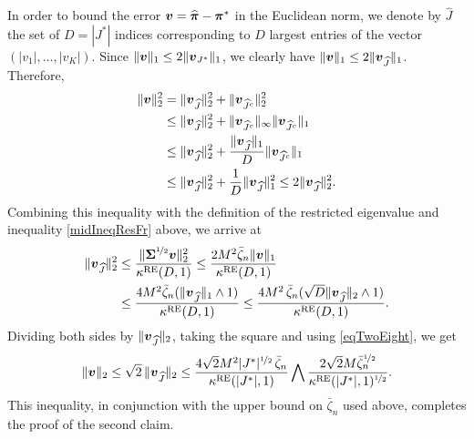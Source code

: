 In order to bound the error $\boldsymbol v=\widehat{\boldsymbol \pi}-\boldsymbol \pi^*$ in the Euclidean norm, we denote
by $\hat J $ the set of $D = |J^*|$ indices corresponding to $D$ largest entries of the
vector $(|v_1|,\ldots,|v_K|)$. Since $\|\boldsymbol v\|_1\le 2\|\boldsymbol v_{J^*}\|_1$, we clearly have
$\|\boldsymbol v\|_1\le 2\|\boldsymbol v_{\widehat J}\|_1$. Therefore,
\begin{align}
\|\boldsymbol v\|_2^2
&= \|\boldsymbol v_{\widehat J}\|_2^2+\|\boldsymbol v_{\widehat J^c}\|_2^2\\
&\le \|\boldsymbol v_{\widehat J}\|_2^2+\|\boldsymbol v_{\widehat J^c}\|_\infty\|\boldsymbol v_{\widehat J^c}\|_1\\
&\le \|\boldsymbol v_{\widehat J}\|_2^2+\frac{\|\boldsymbol v_{\widehat J}\|_1}{D}\|\boldsymbol v_{\widehat J^c}\|_1\\
&\le \|\boldsymbol v_{\widehat J}\|_2^2+\frac{1}{D}\|\boldsymbol v_{\widehat J}\|_1^2\le 2\|\boldsymbol v_{\widehat J}\|_2^2
\label{eqTwoEight}.
\end{align}
Combining this inequality with the definition of the restricted eigenvalue and
inequality \eqref{midIneqResFr} above, we arrive at
\begin{align}
\|\boldsymbol v_{\widehat J}\|_2^2&\le \frac{\|\boldsymbol\Sigma^{\nicefrac12}\boldsymbol v\|_2^2}{\kappa^{\rm RE}(D,1)}
\le  \frac{2M^2\bar\zeta_n\|\boldsymbol v\|_1}{\kappa^{\rm RE}(D,1)}\\
&\le  \frac{4M^2\bar\zeta_n(\|\boldsymbol v_{\widehat J}\|_1\wedge 1)}{\kappa^{\rm RE}(D,1)}
\le  \frac{4M^2\,\bar\zeta_n(\sqrt{D}\|\boldsymbol v_{\widehat J}\|_2\wedge 1)}{\kappa^{\rm RE}(D,1)}.
\end{align}
Dividing both sides by $\|\boldsymbol v_{\widehat J}\|_2$, taking the square and using \eqref{eqTwoEight},
we get
\begin{align}
\|\boldsymbol v\|_2\le \sqrt2\,\|\boldsymbol v_{\widehat J}\|_2
\le  \frac{ 4 \sqrt2 M^2 |J^*|^{\nicefrac12}\,\bar\zeta_n}{\kappa^{\rm RE}(|J^*|,1)}\bigwedge
\frac{2\sqrt2 M \bar\zeta_n^{\nicefrac12}}{\kappa^{\rm RE}(|J^*|,1)^{\nicefrac12}}.
\end{align}
This inequality, in conjunction with the upper bound on $\bar\zeta_n$ used above,
completes the proof of the second claim.




